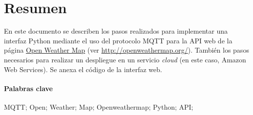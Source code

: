 \thispagestyle{empty}




\section*{Resumen}

En este documento se describen los pasos realizados para implementar una interfaz Python mediante el uso del protocolo MQTT para la API web de la página \href{http://openweathermap.org/}{Open Weather Map} (ver \url{http://openweathermap.org/}). También los pasos necesarios para realizar un despliegue en un servicio \textit{cloud} (en este caso, Amazon Web Services). Se anexa el código de la interfaz web.

\paragraph*{Palabras clave}

MQTT; Open; Weather; Map; Openweathermap; Python; API;